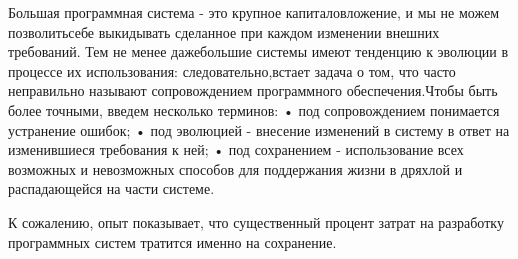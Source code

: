 \documentclass[10pt]{article}
\begin{document}
Большая программная система - это крупное капиталовложение, и мы не можем позволить\linebreak  себе выкидывать сделанное при каждом изменении внешних требований. Тем не менее даже\linebreak  большие системы имеют тенденцию к эволюции в процессе их использования: следовательно,\linebreak  встает задача о том, что часто неправильно называют сопровождением программного обеспечения.\linebreak  Чтобы быть более точными, введем несколько терминов: 
•	под сопровождением понимается устранение ошибок;
•	под эволюцией - внесение изменений в систему в ответ на изменившиеся требования к ней;
•	под сохранением - использование всех возможных и невозможных способов для поддержания жизни в дряхлой и распадающейся на части системе.

К сожалению, опыт показывает, что существенный процент затрат на разработку программных систем тратится именно на сохранение. 
\end{document}
